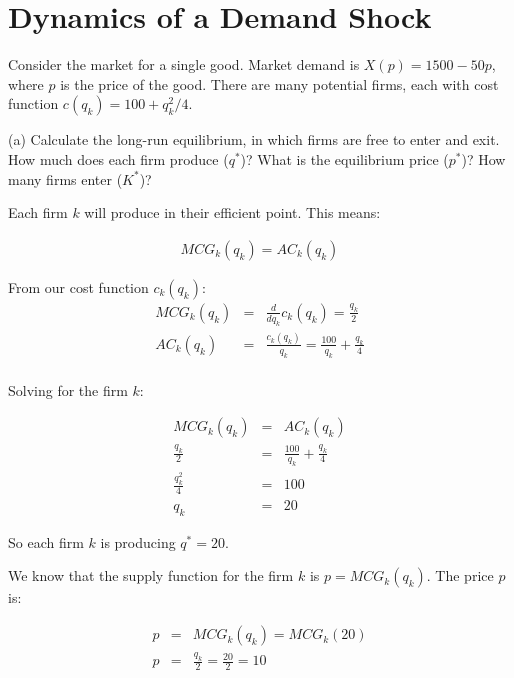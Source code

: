 \section{Dynamics of a Demand Shock}

Consider the market for a single good. Market demand is \( X(p) = 1500 - 50p \), where \( p \) is the price of the good. There are many potential firms, each with cost function \( c(q_k) = 100 + q_k^2/4 \).

\begin{tcolorbox}
    (a) Calculate the long-run equilibrium, in which firms are free to enter and exit. How much does each firm produce (\( q^* \))? What is the equilibrium price (\( p^* \))? How many firms enter (\( K^* \))?
\end{tcolorbox}

Each firm \( k \) will produce in their efficient point. This means:

\begin{eqnarray*}
MCG_k(q_k) = AC_k(q_k)
\end{eqnarray*}

From our cost function \( c_k(q_k) \):
\begin{eqnarray*}
MCG_k(q_k) &=& \frac{d}{dq_k} c_k(q_k) = \frac{q_k}{2}\\
AC_k(q_k) &=& \frac{c_k(q_k)}{q_k} = \frac{100}{q_k} + \frac{q_k}{4}\\
\end{eqnarray*}

Solving for the firm \( k \):

\begin{eqnarray*}
MCG_k(q_k) &=& AC_k(q_k)\\
\frac{q_k}{2} &=& \frac{100}{q_k} + \frac{q_k}{4}\\
\frac{q_k^2}{4} &=& 100\\
q_k &=& 20
\end{eqnarray*}

\begin{myanswerbox}
    So each firm \( k \) is producing \( q^* = 20 \).
\end{myanswerbox}

We know that the supply function for the firm \( k \) is \( p = MCG_k(q_k) \). The price \( p \) is:

\begin{eqnarray*}
p &=& MCG_k(q_k) = MCG_k(20)\\
p &=& \frac{q_k}{2} = \frac{20}{2} = 10
\end{eqnarray*}

